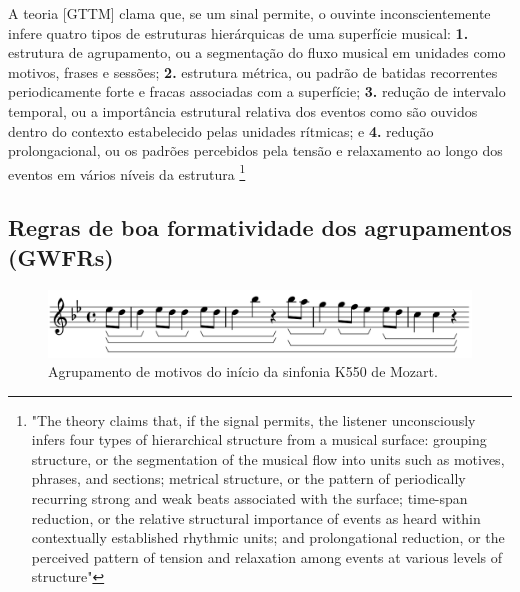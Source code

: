 \documentclass[
	12pt,				%
	openright,			%
	twoside,			%
	a4paper,			%
	english,			%
	french,				%
	spanish,			%
	brazil				%
	]{abntex2}
\begin{document}
\begin{citacao}
A teoria [GTTM] clama que, se um sinal permite, o ouvinte inconscientemente infere quatro tipos de estruturas hierárquicas de uma superfície musical:\linebreak 
\textbf{1.} estrutura de agrupamento, ou a segmentação do fluxo musical em unidades como motivos, frases e sessões; 
\textbf{2.} estrutura métrica, ou padrão de batidas recorrentes periodicamente forte e fracas associadas com a superfície; 
\textbf{3.} redução de intervalo temporal, ou a importância estrutural relativa dos eventos como são ouvidos dentro do contexto estabelecido pelas unidades rítmicas; e
\textbf{4.} redução prolongacional, ou os padrões percebidos pela tensão e relaxamento ao longo dos eventos em vários níveis da estrutura \cite{lerdahl1992cognitive}
\footnote{
"The theory claims that, if the signal permits, the listener unconsciously infers four types of hierarchical structure from a musical surface: grouping structure, or the segmentation of the musical flow into units such as motives, phrases, and sections; metrical structure, or the pattern of periodically recurring strong and weak beats associated with the surface; time-span reduction, or the relative structural importance of events as heard within contextually established rhythmic units; and prolongational reduction, or the perceived pattern of tension and relaxation among events at various levels of structure"\cite{lerdahl1992cognitive}

}
\end{citacao}

\subsection{Regras de boa formatividade dos agrupamentos (GWFRs)}

\begin{figure}[htb]
	\caption{\label{fig_grafico}Agrupamento de motivos do início da sinfonia K550 de Mozart.}
	\begin{center}
	    \includegraphics[scale=0.45]{gttm/lilypondGROUPmozartGTTM.png}
	\end{center}
\end{figure}
\end{document}
